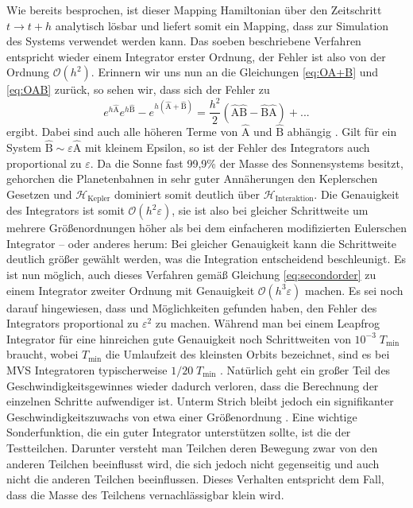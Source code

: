 \documentclass[12pt,a4paper,twoside,open=right,bibliography=totoc]{scrbook}
\renewcommand{\cite}{ \citep}
\renewcommand{\H}{\mathcal H}
\newcommand{\OA}{\operatorname{\widehat{A}}} %
\newcommand{\OB}{\operatorname{\widehat{B}}}
\begin{document}
Wie bereits besprochen, ist dieser Mapping Hamiltonian über den Zeitschritt $t \to t+h$ analytisch lösbar und liefert somit ein Mapping, dass zur Simulation des Systems verwendet werden kann.
Das soeben beschriebene Verfahren entspricht wieder einem Integrator erster Ordnung, der Fehler ist also von der Ordnung $\mathcal{O}(h^2)$.
Erinnern wir uns nun an die Gleichungen \ref{eq:OA+B} und \ref{eq:OAB} zurück, so sehen wir, dass sich der Fehler zu
\begin{equation}
e^{h\OA}e^{h\OB}-e^{h\left(\OA+\OB\right)} = \frac{h^2}{2} \left( \OA\OB-\OB\OA \right) + ...
\end{equation}
ergibt. Dabei sind auch alle höheren Terme von $\OA$ und $\OB$ abhängig\cite{Chambers1999}. Gilt für ein System $\OB\sim\varepsilon \OA$ mit kleinem Epsilon, so ist der Fehler des Integrators auch proportional zu $\varepsilon$.
Da die Sonne fast 99,9\% der Masse des Sonnensystems besitzt, %
gehorchen die Planetenbahnen in sehr guter Annäherungen den Keplerschen Gesetzen und $\H_{\mathrm{Kepler}}$ dominiert somit deutlich über $\H_{\mathrm{Interaktion}}$. Die Genauigkeit des Integrators ist somit $\mathcal{O}(h^2\varepsilon)$, sie ist also bei gleicher Schrittweite um mehrere Größenordnungen höher als bei dem einfacheren modifizierten Eulerschen Integrator – oder anderes herum: Bei gleicher Genauigkeit kann die Schrittweite deutlich größer gewählt werden, was die Integration entscheidend beschleunigt.
Es ist nun möglich, auch dieses Verfahren gemäß Gleichung \ref{eq:secondorder} zu einem Integrator zweiter Ordnung  mit Genauigkeit $\mathcal{O}(h^3\varepsilon)$ machen. Es sei noch darauf hingewiesen, dass \cite{Saha1992} und \cite{Wisdom1996} Möglichkeiten gefunden haben, den Fehler des Integrators proportional zu $\varepsilon^2$ zu machen.
Während man bei einem Leapfrog Integrator für eine hinreichen gute Genauigkeit noch Schrittweiten von $10^{-3}\;T_{\mathrm{min}}$ braucht, wobei $T_{\mathrm{min}}$ die Umlaufzeit des kleinsten Orbits bezeichnet, sind es bei MVS Integratoren typischerweise $1/20\;T_{\mathrm{min}}$\cite{Duncan1998}. Natürlich geht ein großer Teil des Geschwindigkeitsgewinnes wieder dadurch verloren, dass die Berechnung der einzelnen Schritte aufwendiger ist. Unterm Strich bleibt jedoch ein signifikanter Geschwindigkeitszuwachs von etwa einer Größenordnung\cite{Chambers1999}.
Eine wichtige Sonderfunktion, die ein guter Integrator unterstützen sollte, ist die der Testteilchen. Darunter versteht man Teilchen deren Bewegung zwar von den anderen Teilchen beeinflusst wird, die sich jedoch nicht gegenseitig und auch nicht die anderen Teilchen beeinflussen. Dieses Verhalten entspricht dem Fall, dass die Masse des Teilchens  vernachlässigbar klein wird.
\end{document}

